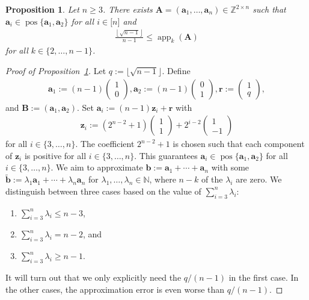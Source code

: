 \documentclass[10pt,a4paper]{amsart}
\newtheorem{proposition}{Proposition}
\newcommand{\N}{\mathbb{N}}
\newcommand{\Z}{\mathbb{Z}}
\DeclareMathOperator{\app}{app}
\newcommand{\bA}{\bm{A}}
\newcommand{\bB}{\bm{B}}
\newcommand{\ba}{\bm{a}}
\newcommand{\bb}{\bm{b}}
\newcommand{\br}{\bm{r}}
\newcommand{\bz}{\bm{z}}
\DeclareMathOperator{\pos}{pos}
\begin{document}
	\begin{proposition}
		\label{prop_semigroup_lower_bound_general}
		Let $n\geq 3$. There exists $\bA = (\ba_1,\ldots,\ba_n)\in\Z^{2\times n}$ such that  $\ba_i\in\pos\lbrace \ba_1,\ba_2\rbrace$ for all $i\in\lbrack n\rbrack$ and
		\begin{align*}
			\frac{\left\lfloor \sqrt{n - 1}\right\rfloor}{n-1}\leq \app_{k}(\bA)
		\end{align*}
		for all $k\in \lbrace 2,\ldots,n-1\rbrace$.
	\end{proposition}

	\begin{proof}[Proof of Proposition~\ref{prop_semigroup_lower_bound_general}]
		Let $q := \lfloor \sqrt{n-1}\rfloor$. Define 
		\begin{align*}
			\ba_1 := (n-1)\begin{pmatrix}
				1 \\ 0
			\end{pmatrix}, \ba_2 := (n-1)\begin{pmatrix}
				0 \\ 1
			\end{pmatrix}, \br := \begin{pmatrix}
				1 \\ q
			\end{pmatrix},
		\end{align*}
		and $\bB := (\ba_1,\ba_2)$. 
		Set $\ba_i := (n-1)\bz_i + \br$ with
		\begin{align*}
			\bz_i := (2^{n-2} + 1)\begin{pmatrix}
				1 \\ 1
			\end{pmatrix} +2^{i-2} \begin{pmatrix}
				1 \\ -1
			\end{pmatrix}
		\end{align*}
		for all $i\in\lbrace 3,\ldots,n\rbrace$. 
		The coefficient $2^{n-2} + 1$ is chosen such that each component of $\bz_i$ is positive for all $i\in\lbrace 3,\ldots,n\rbrace$. This guarantees $\ba_i \in\pos\lbrace \ba_1,\ba_2\rbrace$ for all $i\in\lbrace 3,\ldots,n\rbrace$. 
		We aim to approximate $\bb := \ba_1 + \cdots + \ba_n$ with some $\tilde{\bb}:=\lambda_1\ba_1 + \cdots + \lambda_n\ba_n$ for $\lambda_1,\ldots,\lambda_n\in \N$, where $n-k$ of the $\lambda_i$ are zero. 
		We distinguish between three cases based on the value of $\sum_{i=3}^n\lambda_i$: 
		\begin{enumerate}
			\item $\sum_{i=3}^n\lambda_i\leq n-3$,
			\item $\sum_{i=3}^n\lambda_i = n-2$, and 
			\item $\sum_{i=3}^n\lambda_i\geq n-1$.
		\end{enumerate}
		It will turn out that we only explicitly need the $q/(n-1)$ in the first case.
		In the other cases, the approximation error is even worse than $q/(n-1)$. 
		

\end{proof}
\end{document}
